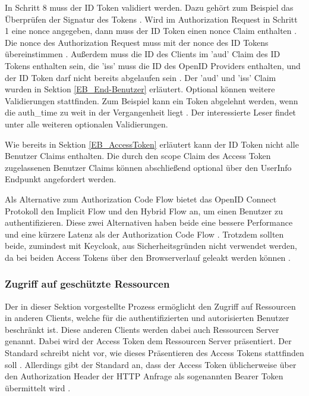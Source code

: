 In Schritt 8 muss der ID Token validiert werden. Dazu gehört zum Beispiel das Überprüfen der Signatur des Tokens \cite{EB24}. Wird im Authorization Request in Schritt 1 eine nonce angegeben, dann muss der ID Token einen nonce Claim enthalten \cite{EB24}. Die nonce des Authorization Request muss mit der nonce des ID Tokens übereinstimmen \cite{EB24}. Außerdem muss die ID des Clients im 'aud' Claim des ID Tokens enthalten sein, die 'iss' muss die ID des OpenID Providers enthalten, und der ID Token darf nicht bereits abgelaufen sein \cite{EB24}. Der 'aud' und 'iss' Claim wurden in Sektion \ref{EB_End-Benutzer} erläutert. Optional können weitere Validierungen stattfinden. Zum Beispiel kann ein Token abgelehnt werden, wenn die auth\_time zu weit in der Vergangenheit liegt \cite{EB24}. Der interessierte Leser findet unter \cite{EB24} alle weiteren optionalen Validierungen.

Wie bereits in Sektion \ref{EB_AccessToken} erläutert kann der ID Token nicht alle Benutzer Claims enthalten. Die durch den scope Claim des Access Token zugelassenen Benutzer Claims können abschließend optional über den UserInfo Endpunkt angefordert werden.

Als Alternative zum Authorization Code Flow bietet das OpenID Connect Protokoll den Implicit Flow und den Hybrid Flow an, um einen Benutzer zu authentifizieren. Diese zwei Alternativen haben beide eine bessere Performance \cite{EB26} und eine kürzere Latenz als der Authorization Code Flow \cite{EB25}. Trotzdem sollten beide, zumindest mit Keycloak, aus Sicherheitsgründen nicht verwendet werden, da bei beiden Access Tokens über den Browserverlauf geleakt werden können \cite{EB26} \cite{EB23}.



\subsubsection{Zugriff auf geschützte Ressourcen} \label{EB_Zugriff auf geschützte Ressourcen}

Der in dieser Sektion vorgestellte Prozess ermöglicht den Zugriff auf Ressourcen in anderen Clients, welche für die authentifizierten und autorisierten Benutzer beschränkt ist. Diese anderen Clients werden dabei auch Ressourcen Server genannt. Dabei wird der Access Token dem Ressourcen Server präsentiert. Der Standard schreibt nicht vor, wie dieses Präsentieren des Access Tokens stattfinden soll \cite{EB28}. Allerdings gibt der Standard an, dass der Access Token üblicherweise über den Authorization Header der HTTP Anfrage als sogenannten Bearer Token übermittelt wird \cite{EB28}. 

